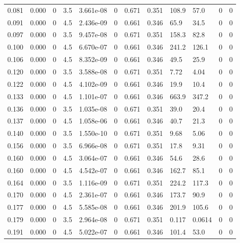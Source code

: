 \documentclass[preview]{standalone}
\begin{document}
{{\begin{tabular}{L{1.2cm}C{1.2cm} C{0.3cm}C{0.5cm} C{1.4cm}C{1.4cm} C{1.4cm}C{1.4cm} C{1.6cm}C{1.6cm} C{1.6cm}C{1.6cm}}
  0.081  &  0.000  & 0     & 3.5 &  3.661e-08  & 0  &  0.671&   0.351& 108.9 & 57.0   &  0 & 0  \\ 
  0.091  &  0.000  & 0     & 4.5 &  2.436e-09  & 0  &  0.661&   0.346& 65.9 & 34.5   &  0 & 0  \\ 
  0.097  &  0.000  & 0     & 3.5 &  9.457e-08  & 0  &  0.671&   0.351& 158.3 & 82.8   &  0 & 0  \\ 
  0.100  &  0.000  & 0     & 4.5 &  6.670e-07  & 0  &  0.661&   0.346& 241.2 & 126.1   &  0 & 0  \\ 
  0.106  &  0.000  & 0     & 4.5 &  8.352e-09  & 0  &  0.661&   0.346& 49.5 & 25.9   &  0 & 0  \\ 
  0.120  &  0.000  & 0     & 3.5 &  3.588e-08  & 0  &  0.671&   0.351& 7.72 & 4.04   &  0 & 0  \\ 
  0.122  &  0.000  & 0     & 4.5 &  4.102e-09  & 0  &  0.661&   0.346& 19.9 & 10.4   &  0 & 0  \\ 
  0.133  &  0.000  & 0     & 4.5 &  1.101e-07  & 0  &  0.661&   0.346& 663.9 & 347.2   &  0 & 0  \\ 
  0.136  &  0.000  & 0     & 3.5 &  1.035e-08  & 0  &  0.671&   0.351& 39.0 & 20.4   &  0 & 0  \\ 
  0.137  &  0.000  & 0     & 4.5 &  1.058e-06  & 0  &  0.661&   0.346& 40.7 & 21.3   &  0 & 0  \\ 
  0.140  &  0.000  & 0     & 3.5 &  1.550e-10  & 0  &  0.671&   0.351& 9.68 & 5.06   &  0 & 0  \\ 
  0.156  &  0.000  & 0     & 3.5 &  6.966e-08  & 0  &  0.671&   0.351& 17.8 & 9.31   &  0 & 0  \\ 
  0.160  &  0.000  & 0     & 4.5 &  3.064e-07  & 0  &  0.661&   0.346& 54.6 & 28.6   &  0 & 0  \\ 
  0.160  &  0.000  & 0     & 4.5 &  4.542e-07  & 0  &  0.661&   0.346& 162.7 & 85.1   &  0 & 0  \\ 
  0.164  &  0.000  & 0     & 3.5 &  1.116e-09  & 0  &  0.671&   0.351& 224.2 & 117.3   &  0 & 0  \\ 
  0.170  &  0.000  & 0     & 4.5 &  2.361e-07  & 0  &  0.661&   0.346& 173.7 & 90.9   &  0 & 0  \\ 
  0.177  &  0.000  & 0     & 4.5 &  5.585e-08  & 0  &  0.661&   0.346& 201.9 & 105.6   &  0 & 0  \\ 
  0.179  &  0.000  & 0     & 3.5 &  2.964e-08  & 0  &  0.671&   0.351& 0.117 & 0.0614   &  0 & 0  \\ 
  0.191  &  0.000  & 0     & 4.5 &  5.022e-07  & 0  &  0.661&   0.346& 101.4 & 53.0   &  0 & 0  \\ 

\end{tabular}}}
\end{document}
